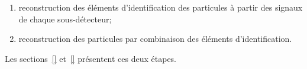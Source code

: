\begin{enumerate}
\item reconstruction des éléments d'identification des particules à partir des signaux de chaque sous-détecteur;
\item reconstruction des particules par combinaison des éléments d'identification.
\end{enumerate}
Les sections~\ref{} et~\ref{} présentent ces deux étapes.




